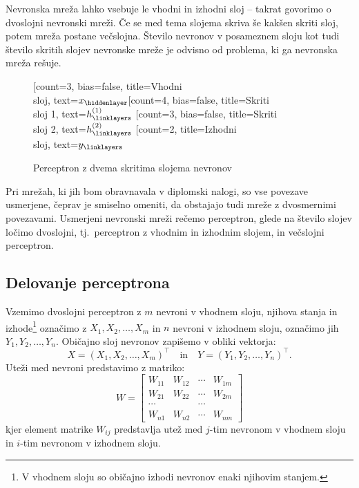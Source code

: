 \documentclass[mat1]{fmfdelo}
\begin{document}
 Nevronska mreža lahko vsebuje le vhodni in izhodni sloj -- takrat govorimo o dvoslojni nevronski mreži. Če se med tema slojema skriva še kakšen skriti sloj, potem mreža postane večslojna. Število nevronov v posameznem sloju kot tudi število skritih slojev nevronske mreže je odvisno od problema, ki ga nevronska mreža rešuje.
%
\begin{figure}
\centering
    \begin{neuralnetwork}[height=4]
        \newcommand{\x}[2]{$x_#2$}
        \newcommand{\y}[2]{$y_#2$}
        \newcommand{\hfirst}[2]{\small $h^{(1)}_#2$}
        \newcommand{\hsecond}[2]{\small $h^{(2)}_#2$}
        [count=3, bias=false, title=Vhodni\\sloj, text=\x]
        \hiddenlayer[count=4, bias=false, title=Skriti\\sloj 1, text=\hfirst] \linklayers
        \hiddenlayer[count=3, bias=false, title=Skriti\\sloj 2, text=\hsecond] \linklayers
        \outputlayer[count=2, title=Izhodni\\sloj, text=\y] \linklayers
    \end{neuralnetwork}
\label{mreza}
\caption{Perceptron z dvema skritima slojema nevronov}
\end{figure}
%
Pri mrežah, ki jih bom obravnavala v diplomski nalogi, so vse povezave usmerjene, čeprav je smiselno omeniti, da obstajajo tudi mreže z dvosmernimi povezavami. Usmerjeni nevronski mreži rečemo perceptron, glede na število slojev ločimo dvoslojni, tj.~perceptron z vhodnim in izhodnim slojem, in večslojni perceptron.  
%
\subsection{Delovanje perceptrona}
Vzemimo dvoslojni perceptron z $m$ nevroni v vhodnem sloju, njihova stanja in izhode\footnote{V vhodnem sloju so običajno izhodi nevronov enaki njihovim stanjem.} označimo z $X_1, X_2, \ldots, X_m$ in $n$ nevroni v izhodnem sloju, označimo jih $Y_1, Y_2, \ldots, Y_{n}$. Običajno sloj nevronov zapišemo v obliki vektorja:
%
\begin{equation*}
X = (X_1, X_2, \dotso, X_m)^\intercal  \quad \text{in} \quad  Y = (Y_1, Y_2, \dotso, Y_n)^\intercal \text{.}
\end{equation*}
%
Uteži med nevroni predstavimo z matriko:
%
\begin{equation*}
W = \begin{bmatrix}
W_{11} &W_{12}  & \cdots & W_{1m}  \\
W_{21}  &W_{22}  &\cdots & W_{2m}  \\
\cdots &  &\cdots &  \\
W_{n1} & W_{n2} & \cdots & W_{nm} 
\end{bmatrix}  
\end{equation*}
%
kjer element matrike $W_{ij}$ predstavlja utež med $j$-tim nevronom v vhodnem sloju in $i$-tim nevronom v izhodnem sloju.
%
\end{document}

